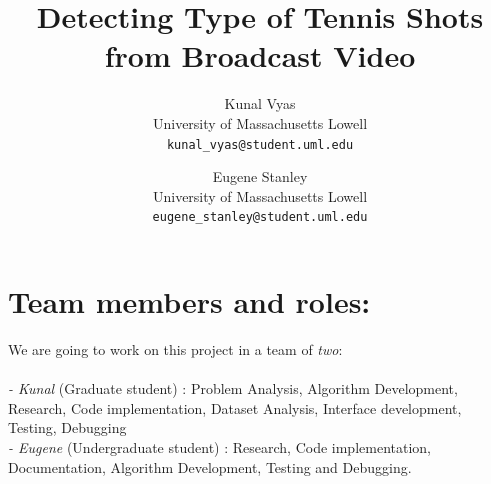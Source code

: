 \documentclass[10.5pt]{article}
\begin{document}
\title{\textbf{Detecting Type of Tennis Shots from Broadcast Video}}
\author{Kunal Vyas\\
    University of Massachusetts Lowell\\
  \texttt{kunal\_vyas@student.uml.edu}
  \and
  Eugene Stanley\\
  University of Massachusetts Lowell\\
  \texttt{eugene\_stanley@student.uml.edu}}
  \date{\vspace{-1ex}}
  \maketitle
  
  \section{Team members and roles:}
  We are going to work on this project in a team of \textit{two}:\\
  \\
    \textit{ - Kunal} (Graduate student) : Problem Analysis, Algorithm Development, Research, Code implementation, Dataset Analysis, Interface development, Testing, Debugging\\
    \textit{ - Eugene} (Undergraduate student) : Research, Code implementation, Documentation, Algorithm Development, Testing and Debugging.
\end{document}

